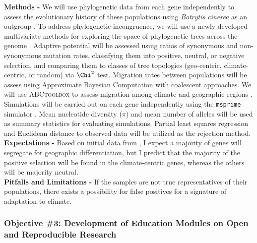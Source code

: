 \documentclass[12pt,letterpaper]{article}
\begin{document}
\noindent \textbf{Methods -} We will use phylogenetic data from each gene independently to assess the evolutionary history of these populations using \textit{Botrytis cinerea} as an outgroup \citep{staats2012genome}. 
To address phylogenetic incongruence, we will use a newly developed multivariate methods for exploring the space of phylogenetic trees across the genome \citep{kendall2016mapping, jombart2017treespace}. 
Adaptive potential will be assessed using ratios of synonymous and non-synonymous mutation rates, classifying them into positive, neutral, or negative selection, and comparing them to classes of tree topologies (geo-centric, climate-centric, or random) via $\Chi^2$ test.
Migration rates between populations will be assess using
Approximate Bayesian Computation with coalescent approaches. We will use \textsc{ABCtoolbox} to assess migration among climate and geographic regions \citep{wegmann2010abctoolbox}. 
Simulations will be carried out on each gene independently using the \texttt{msprime} simulator \citep{kelleher2016efficient}. 
Mean nucleotide diversity ($\pi$) and mean number of alleles will be used as summary statistics for evaluating simulations. 
Partial least squares regression and Euclidean distance to observed data will be utilized as the rejection method.\\
\noindent \textbf{Expectations -}
Based on initial data from \citet{attanayake2013sclerotinia}, I expect a majority of genes will segregate for geographic differentiation, but I predict that the majority of the positive selection will be found in the climate-centric genes, whereas the others will be majority neutral.\\
\noindent \textbf{Pitfalls and Limitations -}
If the samples are not true representatives of their populations, there exists a possibility for false positives for a signature of adaptation to climate.\\

\subsubsection{Objective \#3: Development of Education Modules on Open and Reproducible Research}
\end{document}
